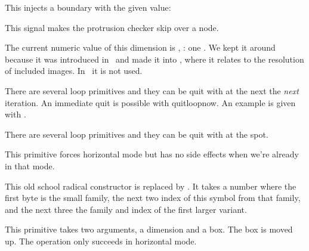 This injects a boundary with the given value:


This signal makes the protrusion checker skip over a node.

\stopnewprimitive

\startnewprimitive[title={\prm {pxdimen}}]

The current numeric value of this dimension is \tointeger \pxdimen, \todimension
\pxdimen: one . We kept it around because it was introduced in \PDFTEX\
and made it into \LUATEX, where it relates to the resolution of included images.
In \CONTEXT\ it is not used.

\stopnewprimitive

\startnewprimitive[title={\prm {quitloop}}]

There are several loop primitives and they can be quit with  at
the next the {\em next} iteration. An immediate quit is possible with \prm
{quitloopnow}. An example is given with \prm {localcontrolledloop}.

\stopnewprimitive

\startnewprimitive[title={\prm {quitloopnow}}]

There are several loop primitives and they can be quit with 
at the spot.

\stopnewprimitive

\startnewprimitive[title={\prm {quitvmode}}]

This primitive forces horizontal mode but has no side effects when we're already
in that mode.

\stopnewprimitive

\startoldprimitive[title={\prm {radical}}][obsolete=yes]

This old school radical constructor is replaced by . It takes a
number where the first byte is the small family, the next two index of this
symbol from that family, and the next three the family and index of the first
larger variant.

\stopoldprimitive

\startoldprimitive[title={\prm {raise}}]

This primitive takes two arguments, a dimension and a box. The box is moved up.
The operation only succeeds in horizontal mode.

\stopoldprimitive

\startnewprimitive[title={\prm {rdivide}}]

